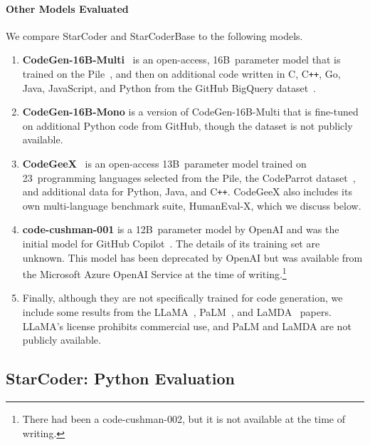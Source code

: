 \documentclass[10pt]{article} %
\newcommand{\cpp}{C\texttt{++}}
\begin{document}
\paragraph{Other Models Evaluated} We compare StarCoder and StarCoderBase to the following models.

\begin{enumerate}
\item \textbf{CodeGen-16B-Multi}~\citep{nijkamp:codegen} is an open-access, 16B~parameter model that is trained on the Pile~\citep{gao2020pile}, and then
on additional code written in C, \cpp{}, Go, Java, JavaScript, and Python from the GitHub BigQuery dataset~\citep{smith2016bigquery}.

\item \textbf{CodeGen-16B-Mono} is a version of CodeGen-16B-Multi that is fine-tuned on additional Python code from GitHub, though the dataset is not publicly available.

\item \textbf{CodeGeeX}~\citep{qinkai:codegeex} is an open-access 13B~parameter model trained on 23~programming languages selected from the Pile, the CodeParrot dataset~\citep{wolf-etal-2020-transformers}, and additional data for Python, Java, and \cpp{}. CodeGeeX also includes its own multi-language benchmark suite, HumanEval-X, which we discuss below. 

\item \textbf{code-cushman-001} is a 12B~parameter model by OpenAI and was the initial model for GitHub Copilot~\citep{chen2021codex}. The details of its training set are unknown. This model has been deprecated by OpenAI but was available from the Microsoft Azure OpenAI Service at the time of writing.\footnote{There had been a code-cushman-002, but it is not available at the time of writing.}

\item Finally, although they are not specifically trained for code generation, we include some results from the LLaMA~\citep{touvron2023llama}, PaLM~\citep{chowdhery2022palm}, and LaMDA~\citep{thoppilan2022lamda} papers. LLaMA's license prohibits commercial use, and PaLM and LaMDA are not publicly available.

\end{enumerate}

\subsection{StarCoder: Python Evaluation}
\end{document}
